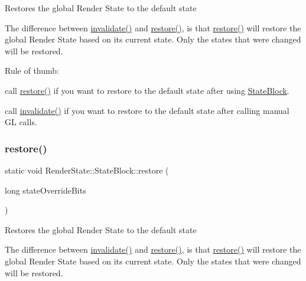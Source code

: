 Restores the global Render State to the default state

The difference between {\ttfamily \hyperlink{classRenderState_1_1StateBlock_a05ce75099029c8cc41f96328df911bd0}{invalidate()}} and {\ttfamily \hyperlink{classRenderState_1_1StateBlock_aa8ce56d1294d4afd7908fa6de4ea00d8}{restore()}}, is that {\ttfamily \hyperlink{classRenderState_1_1StateBlock_aa8ce56d1294d4afd7908fa6de4ea00d8}{restore()}} will restore the global Render State based on its current state. Only the states that were changed will be restored.

Rule of thumb\+:


\begin{DoxyItemize}
\item call {\ttfamily \hyperlink{classRenderState_1_1StateBlock_aa8ce56d1294d4afd7908fa6de4ea00d8}{restore()}} if you want to restore to the default state after using {\ttfamily \hyperlink{classRenderState_1_1StateBlock}{State\+Block}}.
\item call {\ttfamily \hyperlink{classRenderState_1_1StateBlock_a05ce75099029c8cc41f96328df911bd0}{invalidate()}} if you want to restore to the default state after calling manual GL calls. 
\end{DoxyItemize}\mbox{\label{classRenderState_1_1StateBlock_afde47b2f8a831fa8655ae408017dd30d}} 
\subsubsection{\texorpdfstring{restore()}{restore()}\hspace{0.1cm}{\footnotesize\ttfamily [2/2]}}
{\footnotesize\ttfamily static void Render\+State\+::\+State\+Block\+::restore (\begin{DoxyParamCaption}\item[{long}]{state\+Override\+Bits }\end{DoxyParamCaption})\hspace{0.3cm}{\ttfamily [static]}}

Restores the global Render State to the default state

The difference between {\ttfamily \hyperlink{classRenderState_1_1StateBlock_a05ce75099029c8cc41f96328df911bd0}{invalidate()}} and {\ttfamily \hyperlink{classRenderState_1_1StateBlock_aa8ce56d1294d4afd7908fa6de4ea00d8}{restore()}}, is that {\ttfamily \hyperlink{classRenderState_1_1StateBlock_aa8ce56d1294d4afd7908fa6de4ea00d8}{restore()}} will restore the global Render State based on its current state. Only the states that were changed will be restored.

